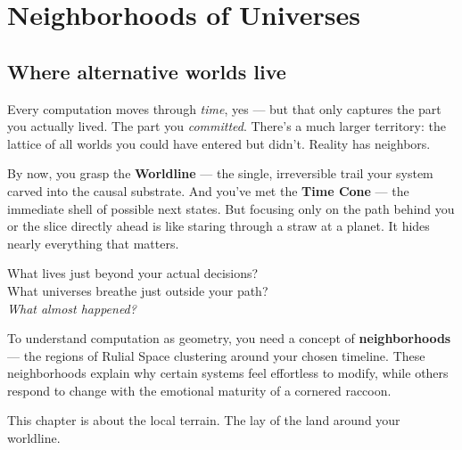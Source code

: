 
\makeatletter
{}
\makeatother

\chapter{Neighborhoods of Universes}
\label{chapter-7-neighborhoods-of-universes}

\section{Where alternative worlds live}

Every computation moves through \emph{time}, yes --- but that only captures the part you actually lived. The part you \emph{committed}. There’s a much larger territory: the lattice of all worlds you could have entered but didn’t. Reality has neighbors.

By now, you grasp the \textbf{Worldline} --- the single, irreversible trail your system carved into the causal substrate. And you’ve met the \textbf{Time Cone} --- the immediate shell of possible next states. But focusing only on the path behind you or the slice directly ahead is like staring through a straw at a planet. It hides nearly everything that matters.

What lives just beyond your actual decisions?\\
What universes breathe just outside your path?\\
\textit{What almost happened?}

To understand computation as geometry, you need a concept of \textbf{neighborhoods} --- the regions of Rulial Space clustering around your chosen timeline. These neighborhoods explain why certain systems feel effortless to modify, while others respond to change with the emotional maturity of a cornered raccoon.

This chapter is about the local terrain. The lay of the land around your worldline.

